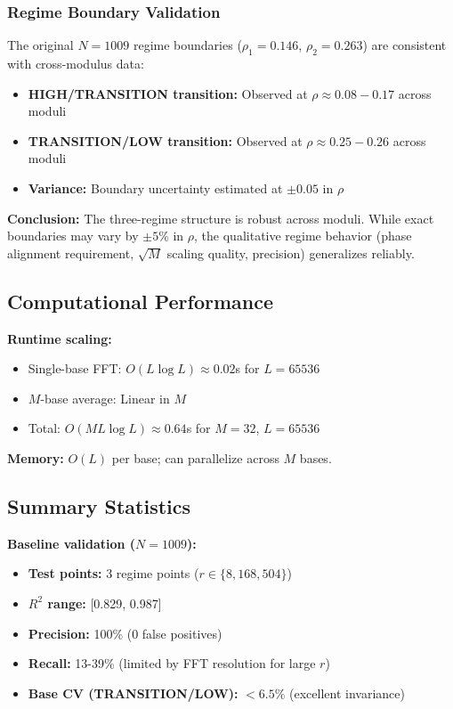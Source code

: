 \subsubsection{Regime Boundary Validation}

The original $N=1009$ regime boundaries ($\rho_1 = 0.146$, $\rho_2 = 0.263$) are consistent with cross-modulus data:
\begin{itemize}
    \item \textbf{HIGH/TRANSITION transition:} Observed at $\rho \approx 0.08-0.17$ across moduli
    \item \textbf{TRANSITION/LOW transition:} Observed at $\rho \approx 0.25-0.26$ across moduli
    \item \textbf{Variance:} Boundary uncertainty estimated at $\pm 0.05$ in $\rho$
\end{itemize}

\textbf{Conclusion:} The three-regime structure is robust across moduli. While exact boundaries may vary by $\pm 5\%$ in $\rho$, the qualitative regime behavior (phase alignment requirement, $\sqrt{M}$ scaling quality, precision) generalizes reliably.

\subsection{Computational Performance}

\textbf{Runtime scaling:}
\begin{itemize}
    \item Single-base FFT: $O(L \log L) \approx 0.02$s for $L=65536$
    \item $M$-base average: Linear in $M$
    \item Total: $O(ML \log L) \approx 0.64$s for $M=32$, $L=65536$
\end{itemize}

\textbf{Memory:} $O(L)$ per base; can parallelize across $M$ bases.

\subsection{Summary Statistics}

\textbf{Baseline validation ($N=1009$):}
\begin{itemize}
    \item \textbf{Test points:} 3 regime points ($r \in \{8, 168, 504\}$)
    \item \textbf{$R^2$ range:} [0.829, 0.987]
    \item \textbf{Precision:} 100\% (0 false positives)
    \item \textbf{Recall:} 13-39\% (limited by FFT resolution for large $r$)
    \item \textbf{Base CV (TRANSITION/LOW):} $< 6.5\%$ (excellent invariance)
\end{itemize}


